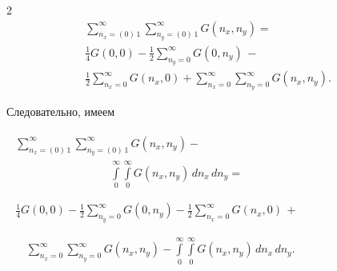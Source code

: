 \documentclass[twoside, 10pt]{article}
\begin{document}
\begin{multicols}{2}
\begin{equation} \label{eq:13}
\begin{array}{c}
    \sum\limits_{n_x=\left(0\right)\,1}^{\infty} \sum\limits_{n_y=\left(0\right)\,1}^{\infty} {G\left(n_x, n_y\right)} = \\
 \frac{1}{4}G\left(0, 0\right) - \frac{1}{2}\sum\limits_{n_y=0}^{\infty}{G\left(0, n_y\right)}\, - \\
\frac{1}{2}\sum\limits_{n_x=0}^{\infty}{G\left(n_x, 0\right)} + \sum\limits_{n_x=0}^{\infty}\sum\limits_{n_y=0}^{\infty}{G\left(n_x, n_y\right)}.
\end{array}
\end{equation}

    Следовательно, имеем

\noindent
\(\begin{array}{l}
\begin{array}{ll}
\sum\limits_{n_x=\left(0\right)\,1}^{\infty} \sum\limits_{n_y=\left(0\right)\,1}^{\infty} G\left(n_x, n_y\right)
 - \\
\,\,\,\,\,\,\,\,\,\,\,\,\,\,\,\,\,\,\,\,\,\,\,\,\,\,\,\,\,\,\,\,\,\,\,\,\,\,\,\,\,\,\,\,\,\,\,\,\,\,\,\int\limits_{0}^{\infty} \int\limits_{0}^{\infty} G\left(n_x, n_y\right)\,d{n_x}\,d{n_y} = & \, \\
\end{array} \\
\begin{array}{c}
\frac{1}{4}G\left(0, 0\right) -\frac{1}{2}\sum\limits_{n_y=0}^{\infty}{G\left(0, n_y\right)} -\frac{1}{2}\sum\limits_{n_x=0}^{\infty}{G\left(n_x, 0\right)}\, + \\
\end{array} \\
\begin{array}{rr}
\, & \sum\limits_{n_x=0}^{\infty}\sum\limits_{n_y=0}^{\infty}{G\left(n_x, n_y\right)} - \int\limits_{0}^{\infty} \int\limits_{0}^{\infty} G\left(n_x, n_y\right)\,d{n_x}\,d{n_y}.
\end{array}
\end{array}\)


\end{multicols}
\end{document}
